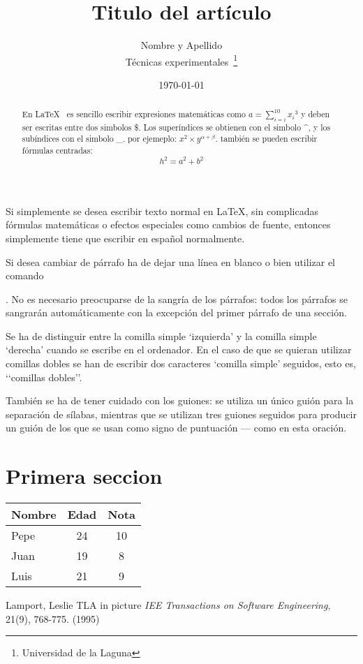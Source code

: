 \documentclass[a4paper,12pt]{article}
\begin{document}
  Si simplemente se desea escribir texto normal en LaTeX,
  sin complicadas f\'ormulas matem\'aticas o efectos especiales
  como cambios de fuente, entonces simplemente tiene que escribir
  en espa\~nol normalmente.
  
  Si desea cambiar de p\'arrafo ha de dejar una l\'inea en blanco o bien
  utilizar el comando \par.
  No es necesario preocuparse de la sangr\'ia de los p\'arrafos:
  todos los p\'arrafos se sangrar\'an autom\'aticamente con la excepci\'on
  del primer p\'arrafo de una secci\'on.
  
  Se ha de distinguir entre la comilla simple ‘izquierda’
  y la comilla simple ‘derecha’ cuando se escribe en el ordenador.
  En el caso de que se quieran utilizar comillas dobles se han de
  escribir dos caracteres ‘comilla simple’ seguidos, esto es,
  ‘‘comillas dobles’’.
  
  Tambi\'en se ha de tener cuidado con los guiones: se utiliza un \'unico
  gui\'on para la separaci\'on de s\'ilabas, mientras que se utilizan
  tres guiones seguidos para producir un gui\'on de los que se usan
  como signo de puntuaci\'on --- como en esta oraci\'on.
  
  \title{Titulo del art\'iculo}
  \author{Nombre y Apellido \\ 
	  T\'ecnicas experimentales~\footnote{Universidad de la Laguna}
	  }
  \date{\today}
  \maketitle
  
  \begin{abstract}
   En \LaTeX{}~\cite{Lam:86} es sencillo escribir expresiones
   matem\'aticas como $a=\sum_{i=i}^{10} {x_i}^{3}$
   y deben ser escritas entre dos simbolos \$.
   Los super\'indices se obtienen con el simbolo \^{}, y
   los sub\'indices con el simbolo \_. 
   por ejemeplo: $x^2 \times y^{\alpha + \beta}$.
   tambi\'en se pueden escribir f\'ormulas centradas:
   \[h^2=a^2 + b^2\] 
  \end{abstract}
  
  \section{Primera seccion}
  
  \bigskip
  \begin{tabular}{|l|c|c|}
    \hline
      Nombre & Edad & Nota \\ \hline
      Pepe   & 24   & 10 \\ \hline
      Juan   & 19   & 8 \\ \hline
      Luis   & 21   & 9 \\ \hline      
      
  \end{tabular}

  
  
  \begin{thebibliography}{00}
    Lamport, Leslie
    TLA in picture
    \emph{IEE Transactions on Software Engineering},
    21(9), 768-775.
    (1995)
  \end{thebibliography}
\end{document}

